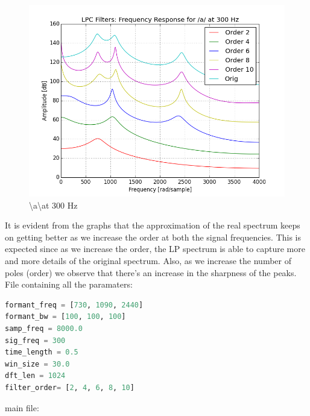 \documentclass[a4paper]{article}
\begin{document}
\begin{figure}[h!]
    \includegraphics[width=\linewidth]{./images/300.png}
    \caption{ \textbackslash a\textbackslash at $300$ Hz}
    \label{fig:1}
\end{figure}


It is evident from the graphs that the approximation of the real spectrum keeps on getting better as we increase the order at both the signal frequencies. This is expected since as we increase the order, the LP spectrum is able to capture more and more details of the original spectrum. 
Also, as we increase the number of poles (order) we observe that there's an increase in the sharpness of the peaks. \\ 

File containing all the paramaters:
\begin{lstlisting}[language=Python, caption=hparams.py]
formant_freq = [730, 1090, 2440]
formant_bw = [100, 100, 100]
samp_freq = 8000.0
sig_freq = 300
time_length = 0.5
win_size = 30.0
dft_len = 1024
filter_order= [2, 4, 6, 8, 10]
\end{lstlisting}

main file: 
\end{document}
